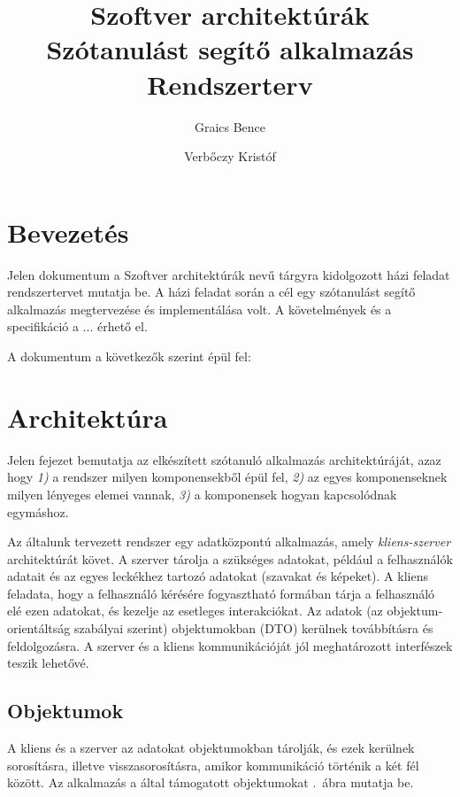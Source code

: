 \documentclass[11pt, a4paper]{article}
\begin{document}
\title{Szoftver architektúrák \\ Szótanulást segítő alkalmazás \\ \large{Rendszerterv}}
    \author{Graics Bence \and Verbőczy Kristóf}

    \maketitle
    
    \tableofcontents
    \newpage
    
    \section{Bevezetés}
    \label{sec:bevezetes}
    Jelen dokumentum a Szoftver architektúrák nevű tárgyra kidolgozott házi feladat rendszertervet mutatja be. A házi feladat során a cél egy szótanulást segítő alkalmazás megtervezése és implementálása volt. A követelmények és a specifikáció a ... érhető el.
    
    A dokumentum a következők szerint épül fel:
    
    \section{Architektúra}
    \label{sec:architektúra}
    Jelen fejezet bemutatja az elkészített szótanuló alkalmazás architektúráját, azaz hogy \textit{1)} a rendszer milyen komponensekből épül fel, \textit{2)} az egyes komponenseknek milyen lényeges elemei vannak, \textit{3)} a komponensek hogyan kapcsolódnak egymáshoz.
    
    Az általunk tervezett rendszer egy adatközpontú alkalmazás, amely \emph{kliens-szerver} architektúrát követ. A szerver tárolja a szükséges adatokat, például a felhasználók adatait és az egyes leckékhez tartozó adatokat (szavakat és képeket). A kliens feladata, hogy a felhasználó kérésére fogyasztható formában tárja a felhasználó elé ezen adatokat, és kezelje az esetleges interakciókat. Az adatok (az objektum-orientáltság szabályai szerint) objektumokban (DTO) kerülnek továbbításra és feldolgozásra. A szerver és a kliens kommunikációját jól meghatározott interfészek teszik lehetővé.
    
    \subsection{Objektumok}
    A kliens és a szerver az adatokat objektumokban tárolják, és ezek kerülnek sorosításra, illetve visszasorosításra, amikor kommunikáció történik a két fél között. Az alkalmazás a által támogatott objektumokat .~ábra mutatja be.
    
\end{document}
